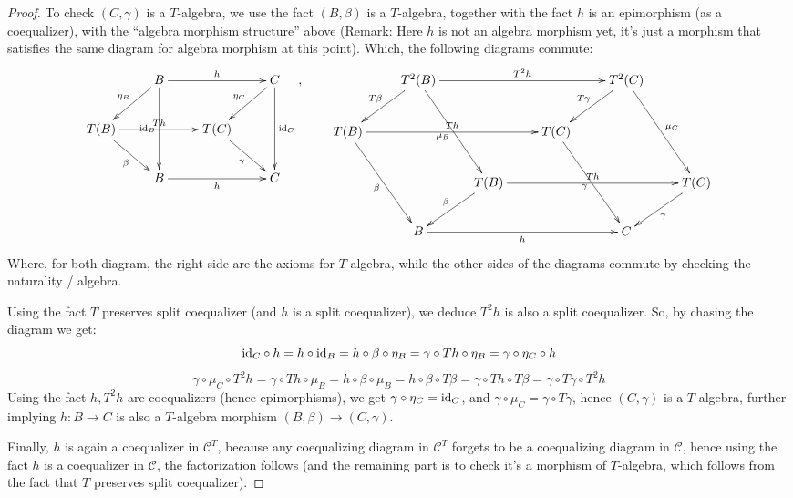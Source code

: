 \documentclass{article}
\begin{document}
\begin{proof}
        To check $(C,\gamma)$ is a $T$-algebra, we use the fact $(B,\beta)$ is a $T$-algebra, together with the fact $h$ is an epimorphism (as a coequalizer), with the ``algebra morphism structure'' above (Remark: Here $h$ is not an algebra morphism yet, it's just a morphism that satisfies the same diagram for algebra morphism at this point). Which, the following diagrams commute:
        \[\xymatrix{
            & B \ar[rr]^-{h} \ar[dl]_-{\eta_B} \ar[dd]_-{\id_B} && C \ar[dl]_-{\eta_C} \ar[dd]^-{\id_C}\\
            T(B) \ar[rr]^-{Th} \ar[dr]_-{\beta} && T(C) \ar[dr]_-{\gamma}\\
            & B \ar[rr]_-{h} && C
        },\quad\quad \xymatrix{
            & T^2(B) \ar[rrr]^-{T^2h} \ar[dl]_-{T\beta} \ar[ddr]_-{\mu_B} &&& T^2(C) \ar[dl]_-{T\gamma} \ar[ddr]^-{\mu_C}\\
            T(B) \ar[rrr]^-{Th} \ar[ddr]_-{\beta} &&& T(C) \ar[ddr]_{\gamma}\\
            && T(B) \ar[dl]_-{\beta} \ar[rrr]^-{Th} &&& T(C) \ar[dl]^-{\gamma}\\
            & B \ar[rrr]_-{h} &&& C
        }\]
        Where, for both diagram, the right side are the axioms for $T$-algebra, while the other sides of the diagrams commute by checking the naturality / algebra. 

        Using the fact $T$ preserves split coequalizer (and $h$ is a split coequalizer), we deduce $T^2h$ is also a split coequalizer. So, by chasing the diagram we get:
        \[\mathrm{id}_C\circ h=h\circ \mathrm{id}_B = h\circ \beta\circ \eta_B = \gamma\circ Th\circ \eta_B = \gamma\circ \eta_C\circ h\]
        \[\gamma\circ \mu_C\circ T^2h = \gamma\circ Th\circ \mu_B=h\circ \beta\circ \mu_B=h\circ \beta\circ T\beta=\gamma\circ Th\circ T\beta = \gamma\circ T\gamma \circ T^2h\]
        Using the fact $h,T^2h$ are coequalizers (hence epimorphisms), we get $\gamma\circ \eta_C = \mathrm{id}_C$, and $\gamma\circ \mu_C = \gamma\circ T\gamma$, hence $(C,\gamma)$ is a $T$-algebra, further implying $h:B\rightarrow C$ is also a $T$-algebra morphism $(B,\beta)\rightarrow (C,\gamma)$.

        \hfil

        Finally, $h$ is again a coequalizer in $\mathcal{C}^T$, because any coequalizing diagram in $\mathcal{C}^T$ forgets to be a coequalizing diagram in $\mathcal{C}$, hence using the fact $h$ is a coequalizer in $\mathcal{C}$, the factorization follows (and the remaining part is to check it's a morphism of $T$-algebra, which follows from the fact that $T$ preserves split coequalizer).
\end{proof}
\end{document}
